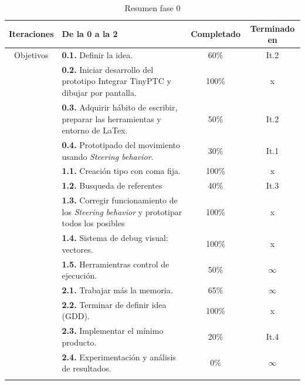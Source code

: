 \begin{longtable}[c]{|c|p{7cm}|c|c|}
\hline
Iteraciones & De la 0 a la 2                                                & Completado    & Terminado en \\ 
\hline
Objetivos   &   \textbf{0.1.} Definir la idea.                              & 60\%          & It.2         \\
	\cmidrule[.006pt]{2-4}
			&   \textbf{0.2.} Iniciar desarrollo del prototipo
								Integrar TinyPTC y dibujar por pantalla.    & 100\%         & x            \\
	\cmidrule[.006pt]{2-4}
			&	\textbf{0.3.} Adquirir hábito de escribir, preparar
								las herramientas y entorno de LaTex.        & 50\%          & It.2         \\
	\cmidrule[.006pt]{2-4}
			&	\textbf{0.4.} Prototipado del movimiento usando 
								\textit{Steering behavior}.                 & 30\%          & It.1         \\
\cmidrule[1pt]{2-4}
			&	\textbf{1.1.} Creación tipo con coma fija.                  & 100\%         & x            \\
	\cmidrule[.006pt]{2-4}
			&	\textbf{1.2.} Busqueda de referentes                        & 40\%          & It.3         \\
	\cmidrule[.006pt]{2-4}
	    	&	\textbf{1.3.} Corregir funcionamiento de los
								\textit{Steering behavior} y
								prototipar todos los posibles               & 100\%         & x            \\
	\cmidrule[.006pt]{2-4}
			&	\textbf{1.4.} Sistema de debug visual: vectores.            & 100\%         & x            \\ 
	\cmidrule[.006pt]{2-4}
			&	\textbf{1.5.} Herramientras control de ejecución.           & 50\%          & $\infty$     \\ 
\cmidrule[1.5pt]{2-4}
			&	\textbf{2.1.} Trabajar más la memoria.                      & 65\%          & $\infty$     \\
	\cmidrule[.006pt]{2-4}
			&	\textbf{2.2.} Terminar de definir idea (GDD).               & 100\%         & x            \\
	\cmidrule[.006pt]{2-4}
			&	\textbf{2.3.} Implementar el mínimo producto.               & 20\%          & It.4         \\
	\cmidrule[.006pt]{2-4}
			&	\textbf{2.4.} Experimentación y análisis de resultados.     & 0\%           & $\infty$     \\
\hline
\caption{Resumen fase 0}
\end{longtable}

